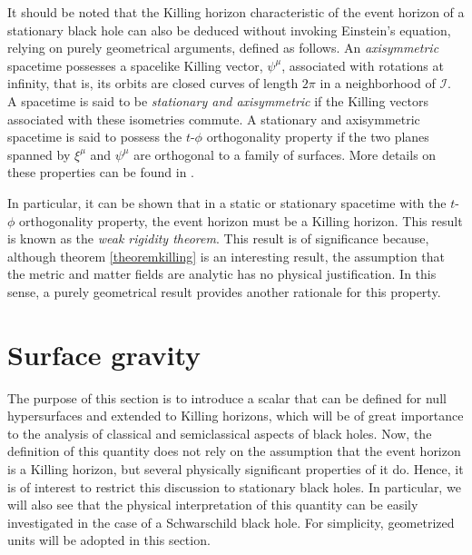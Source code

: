 \documentclass[
12pt,		%
openright,	%
twoside,  %
a4paper,			%
chapter=TITLE,		%
english,			%
french,				%
spanish,			%
brazil				%
]{USPSC-classe/USPSC}
\begin{document}
It should be noted that the Killing horizon characteristic of the event horizon of a stationary black hole can also be deduced without invoking Einstein's equation, relying on purely geometrical arguments, defined as follows. An \textit{axisymmetric} spacetime possesses a spacelike Killing vector, $\psi^{\mu}$, associated with rotations at infinity, that is, its orbits are closed curves of length $2\pi$ in a neighborhood of $\mathscr{I}$. A spacetime is said to be \textit{stationary and axisymmetric} if the Killing vectors associated with these isometries commute. A stationary and axisymmetric spacetime is said to possess the $t$-$\phi$ orthogonality property if the two planes spanned by $\xi^{\mu}$ and $\psi^{\mu}$ are orthogonal to a family of surfaces. More details on these properties can be found in \cite{Wald1984}.

In particular, it can be shown \cite{Heusler1996} that in a static or stationary spacetime with the $t$-$\phi$ orthogonality property, the event horizon must be a Killing horizon. This result is known as the \textit{weak rigidity theorem}. This result is of significance because, although theorem \ref{theoremkilling} is an interesting result, the assumption that the metric and matter fields are analytic has no physical justification. In this sense, a purely geometrical result provides another rationale for this property.

\section{Surface gravity}\label{kappas}

The purpose of this section is to introduce a scalar that can be defined for null hypersurfaces and extended to Killing horizons, which will be of great importance to the analysis of classical and semiclassical aspects of black holes. Now, the definition of this quantity does not rely on the assumption that the event horizon is a Killing horizon, but several physically significant properties of it do. Hence, it is of interest to restrict this discussion to stationary black holes. In particular, we will also see that the physical interpretation of this quantity can be easily investigated in the case of a Schwarschild black hole. For simplicity, geometrized units will be adopted in this section.
\end{document}
